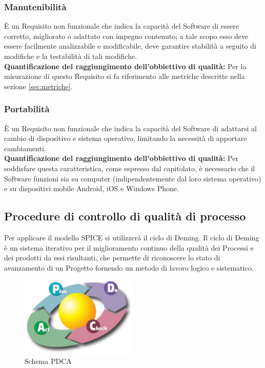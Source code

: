 \subsubsection{Manutenibilità}
È un Requisito non funzionale che indica la capacità del Software di essere corretto, migliorato o adattato con impegno contenuto; a tale scopo esso deve essere facilmente analizzabile e modificabile, deve garantire stabilità a seguito di modifiche e la testabilità di tali modifiche.  \\
\textbf{Quantificazione del raggiungimento dell’obbiettivo di qualità:} Per la misurazione di questo Requisito si fa riferimento alle metriche descritte nella sezione \ref{sec:metriche}.

\subsubsection{Portabilità}
È un Requisito non funzionale che indica la capacità del Software di adattarsi al cambio di dispositivo e sistema operativo, limitando la necessità di apportare cambiamenti.\\
\textbf{Quantificazione del raggiungimento dell’obbiettivo di qualità:} Per soddisfare questa caratteristica, come espresso dal capitolato, è necessario che il Software funzioni sia su computer (indipendentemente dal loro sistema operativo) e su dispositivi mobile Android, iOS e Windows Phone.

\subsection{Procedure di controllo di qualità di processo}
Per applicare il modello SPICE si utilizzerà il ciclo di Deming. Il ciclo di Deming è un sistema iterativo per il miglioramento continuo della qualità dei Processi e dei prodotti da essi risultanti, che permette di riconoscere lo stato di avanzamento di un Progetto fornendo un metodo di lavoro logico e sistematico.

\begin{figure}[h]
  \centering
    \includegraphics[width=0.5\textwidth]{./images/deming}
  \caption{Schema PDCA}
  \label{fig:deming}
\end{figure}

